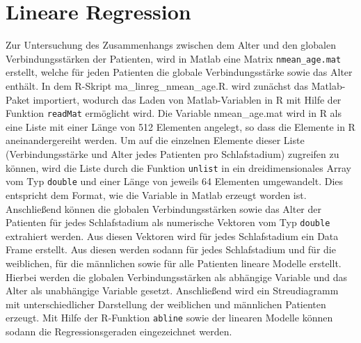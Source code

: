 %

\section{Lineare Regression}

Zur Untersuchung des Zusammenhangs zwischen dem Alter und den globalen Verbindungsstärken der Patienten, wird in Matlab eine Matrix \texttt{nmean\_age.mat} erstellt, welche für jeden Patienten die globale Verbindungsstärke sowie das Alter enthält. In dem R-Skript ma\_linreg\_nmean\_age.R. wird zunächst das Matlab-Paket importiert, wodurch das Laden von Matlab-Variablen in R mit Hilfe der Funktion \texttt{readMat} ermöglicht wird. Die Variable nmean\_age.mat wird in R als eine Liste mit einer Länge von 512 Elementen angelegt, so dass die Elemente in R aneinandergereiht werden. Um auf die einzelnen Elemente dieser Liste (Verbindungsstärke und Alter jedes Patienten pro Schlafstadium) zugreifen zu können, wird die Liste durch die Funktion \texttt{unlist} in ein dreidimensionales Array vom Typ \texttt{double} und einer Länge von jeweils 64 Elementen umgewandelt. Dies entspricht dem Format, wie die Variable in Matlab erzeugt worden ist. Anschließend können die globalen Verbindungsstärken sowie das Alter der Patienten für jedes Schlafstadium als numerische Vektoren vom Typ \texttt{double} extrahiert werden. Aus diesen Vektoren wird für jedes Schlafstadium ein Data Frame erstellt. Aus diesen werden sodann für jedes Schlafstadium und für die weiblichen, für die männlichen sowie für alle Patienten lineare Modelle erstellt. Hierbei werden die globalen Verbindungsstärken als abhängige Variable und das Alter als unabhängige Variable gesetzt. Anschließend wird ein Streudiagramm mit unterschiedlicher Darstellung der weiblichen und männlichen Patienten erzeugt. Mit Hilfe der R-Funktion \texttt{abline} sowie der linearen Modelle können sodann die Regressionsgeraden eingezeichnet werden.\\

